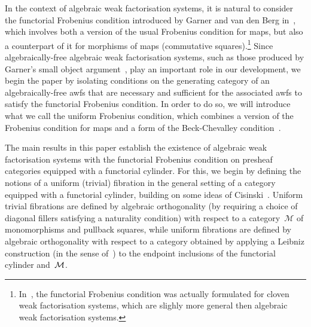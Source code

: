 \documentclass[reqno,10pt,a4paper,oneside,draft]{amsart}
\begin{document}
In the context of algebraic weak factorisation systems, it is natural to consider the functorial
Frobenius condition introduced by Garner and van den Berg in~\cite{garner:topological-simplicial}, which involves
both a version of the usual Frobenius condition for maps, but  also a counterpart of it for morphisms of maps (\ie commutative squares).\footnote{In~\cite{garner:topological-simplicial},
the functorial Frobenius condition was actually formulated for cloven weak factorisation systems,
which are slighly more general then algebraic weak factorisation systems.} Since algebraically-free algebraic 
weak factorisation systems, such as those produced by Garner's small object
argument~\cite{garner:small-object-argument}, 
play an important role in our development, we begin the paper by 
isolating   conditions on the generating 
category of an algebraically-free awfs that are necessary and sufficient for the associated
awfs to satisfy the functorial Frobenius condition. 
In order to do so, we will introduce what we call the uniform Frobenius condition,
which combines a version of the Frobenius condition for maps and a form of the
Beck-Chevalley condition~\cite{benabou-descente,lawvere-equality}.

The main results in this paper establish the existence of algebraic weak factorisation systems with the functorial Frobenius condition on presheaf categories
equipped with a functorial cylinder. For this, we begin by defining the notions of a 
uniform (trivial) fibration in the general setting of a  category equipped with a functorial cylinder, building on some ideas of Cisinski~\cite{cisinski-asterisque}.
Uniform trivial fibrations are defined by algebraic  orthogonality (\ie by requiring a choice
of diagonal fillers satisfying a naturality condition) with respect to a category~$\mathcal{M}$ of monomorphisms and pullback squares, while uniform fibrations are defined by algebraic orthogonality  with respect to a category obtained by applying a Leibniz construction 
(in the sense of~\cite{riehl-verity:reedy}) to the endpoint inclusions of the functorial cylinder and~$\cal{M}$.
\end{document}

